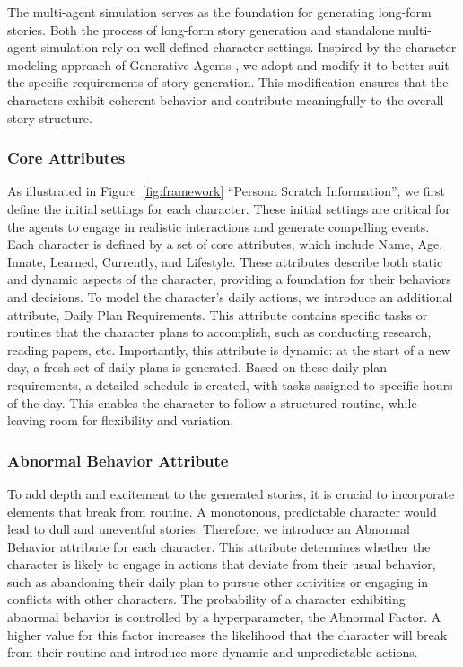 \documentclass[letterpaper]{article} %
\begin{document}
The multi-agent simulation serves as the foundation for generating long-form stories. Both the process of long-form story generation and standalone multi-agent simulation rely on well-defined character settings. Inspired by the character modeling approach of Generative Agents \cite{park2023generative}, we adopt and modify it to better suit the specific requirements of story generation. This modification ensures that the characters exhibit coherent behavior and contribute meaningfully to the overall story structure.

\subsubsection{Core Attributes}

As illustrated in Figure~\ref{fig:framework} ``Persona Scratch Information'', we first define the initial settings for each character. These initial settings are critical for the agents to engage in realistic interactions and generate compelling events. Each character is defined by a set of core attributes, which include Name, Age, Innate, Learned, Currently, and Lifestyle. These attributes describe both static and dynamic aspects of the character, providing a foundation for their behaviors and decisions. To model the character's daily actions, we introduce an additional attribute, Daily Plan Requirements. This attribute contains specific tasks or routines that the character plans to accomplish, such as conducting research, reading papers, etc. Importantly, this attribute is dynamic: at the start of a new day, a fresh set of daily plans is generated. Based on these daily plan requirements, a detailed schedule is created, with tasks assigned to specific hours of the day. This enables the character to follow a structured routine, while leaving room for flexibility and variation.

\subsubsection{Abnormal Behavior Attribute}

To add depth and excitement to the generated stories, it is crucial to incorporate elements that break from routine. A monotonous, predictable character would lead to dull and uneventful stories. Therefore, we introduce an Abnormal Behavior attribute for each character. This attribute determines whether the character is likely to engage in actions that deviate from their usual behavior, such as abandoning their daily plan to pursue other activities or engaging in conflicts with other characters. The probability of a character exhibiting abnormal behavior is controlled by a hyperparameter, the Abnormal Factor. A higher value for this factor increases the likelihood that the character will break from their routine and introduce more dynamic and unpredictable actions.
\end{document}
